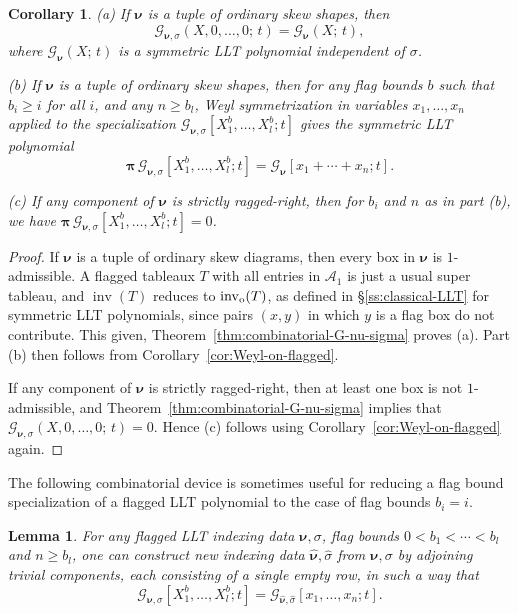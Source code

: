 \documentclass[12pt]{amsart}
\newtheorem{lemma}[thm]{Lemma}
\newtheorem{cor}[thm]{Corollary}
\theoremstyle{definition}
\theoremstyle{remark}
\newcommand{\nubold}{{\boldsymbol \nu }}
\newcommand{\pibold}{{\boldsymbol \pi }}
\newcommand{\Weyl}{\pibold }
\newcommand{\Acal}{{\mathcal A}}
\newcommand{\Gcal}{{\mathcal G}}
\newcommand{\sigmahat}{\widehat{\sigma }}
\newcommand{\nuboldhat}{\widehat{\nubold }}
\DeclareMathOperator{\inv}{inv}
\newcommand{\oinv}{\inv _{{\rm o}}}
\begin{document}
\begin{cor}\label{cor:Weyl-on-G-nu-sigma}
(a) If $\nubold $ is a tuple of ordinary skew shapes, then
\begin{equation}\label{e:flagged-to-symmetric}
\Gcal _{\nubold ,\sigma }(X,0,\ldots,0;\, t) = \Gcal _{\nubold }(X;\,
t),
\end{equation}
where $\Gcal _{\nubold }(X;\,
t)$ is a symmetric LLT polynomial independent of $\sigma $.

(b) If $\nubold $ is a tuple of ordinary skew shapes, then for any
flag bounds $b$ such that $b_{i}\geq i$ for all $i$, and any $n\geq
b_{l}$, Weyl symmetrization in variables $x_{1},\ldots,x_{n}$ applied
to the specialization $\Gcal _{\nubold ,\sigma
}[X^{b}_{1},\ldots,X^{b}_{l}; t]$ gives the symmetric LLT polynomial
\begin{equation}\label{e:Weyl-on-G-nu-sigma}
\Weyl \, \Gcal _{\nubold ,\sigma }[X^{b}_{1},\ldots,X^{b}_{l}; t] = \Gcal
_{\nubold }[x_{1}+\cdots +x_{n}; t].
\end{equation}

(c) If any component of $\nubold $ is strictly ragged-right, then for
$b_{i}$ and $n$ as in part (b), we have $\Weyl \, \Gcal _{\nubold ,\sigma
}[X^{b}_{1},\ldots,X^{b}_{l}; t] =0$.
\end{cor}

\begin{proof}
If $\nubold $ is a tuple of ordinary skew diagrams, then every box in
$\nubold $ is $1$-admissible.  A flagged tableaux $T$ with all entries
in $\Acal _{1}$ is just a usual super tableau, and $\inv (T)$ reduces
to $\oinv (T)$, as defined in \S \ref{ss:classical-LLT} for symmetric
LLT polynomials, since pairs $(x,y)$ in which $y$ is a flag box do not
contribute.  This given, Theorem~\ref{thm:combinatorial-G-nu-sigma}
proves (a).  Part (b) then follows from
Corollary~\ref{cor:Weyl-on-flagged}.

If any component of $\nubold $ is strictly ragged-right,
then at least one box is not $1$-admissible, and
Theorem~\ref{thm:combinatorial-G-nu-sigma} implies that $\Gcal
_{\nubold ,\sigma }(X,0,\ldots,0;\, t) = 0$.
Hence (c)  follows using Corollary~\ref{cor:Weyl-on-flagged} again.
\end{proof}

The following combinatorial device is sometimes useful for reducing a
flag bound specialization of a flagged LLT polynomial to the case of
flag bounds $b_{i}=i$.

\begin{lemma}\label{lem:empty-rows-trick}
For any flagged LLT indexing data $\nubold ,\sigma $, flag bounds
$0<b_{1}<\cdots <b_{l}$ and $n\geq b_{l}$, one can construct new
indexing data $\nuboldhat ,\sigmahat $ from $\nubold ,\sigma $ by
adjoining trivial components, each consisting of a single empty row,
in such a way that
\begin{equation}\label{e:empty-rows-trick}
\Gcal _{\nubold ,\sigma }[X^{b}_{1},\ldots,X^{b}_{l}; t] = \Gcal
_{\nuboldhat ,\sigmahat }[x_{1},\ldots,x_{n}; t].
\end{equation}
\end{lemma}
\end{document}
